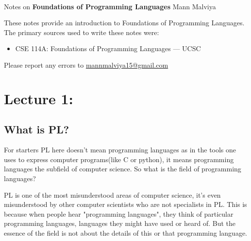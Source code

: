 \documentclass[11pt]{article}
\begin{document}
\thispagestyle{empty}
\bigskip \
\vspace{0.1cm}

\begin{center}
{\fontsize{22}{22} \selectfont Notes on}
\vskip 16pt
{\fontsize{20}{20} \selectfont \bf \sffamily Foundations of Programming Languages}
\vskip 24pt
{\fontsize{18}{18} \selectfont \rmfamily Mann Malviya}
\vskip 6pt
{\fontsize{14}{14} \selectfont {}}
\vskip 24pt
\end{center}

{\parindent0pt \baselineskip=15.5pt These notes provide an introduction to Foundations of Programming Languages. The primary sources used to write these notes were:

\begin{itemize}
    \item CSE 114A: Foundations of Programming Languages — UCSC
\end{itemize}

Please report any errors to \href{mailto:mannmalviya15@gmail.com}{mannmalviya15@gmail.com}


}

\newpage
\tableofcontents
\newpage

\section*{Lecture 1:}

\subsection*{What is PL?}
For starters PL here doesn't mean programming languages as in the tools one uses to express computer programs(like C or python), it means programming languages the subfield of computer science. So what is the field of programming languages?

PL is one of the most misunderstood areas of computer science, it's even misunderstood by other computer scientists who are not specialists in PL. This is because when people hear "programming languages", they think of particular programming languages, languages they might have used or heard of. But the essence of the field is not about the details of this or that programming language.
\end{document}
